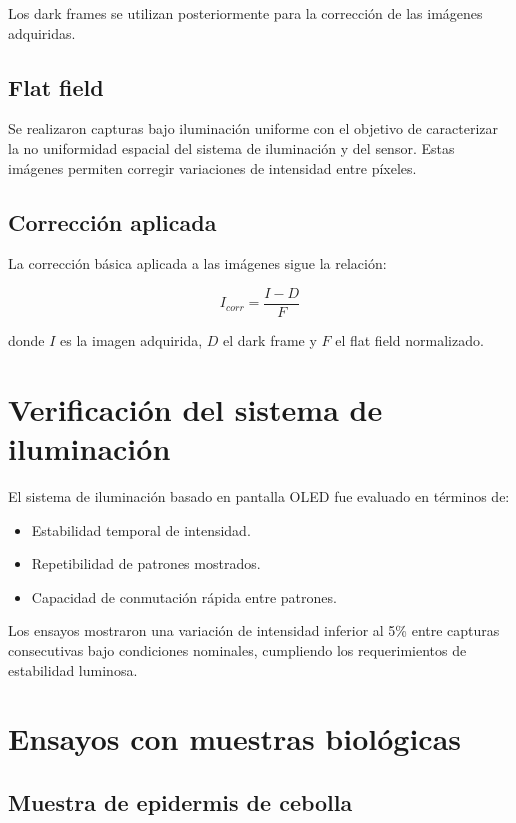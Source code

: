 Los dark frames se utilizan posteriormente para la corrección de las imágenes
adquiridas.

\subsection{Flat field}

Se realizaron capturas bajo iluminación uniforme con el objetivo de caracterizar
la no uniformidad espacial del sistema de iluminación y del sensor. Estas
imágenes permiten corregir variaciones de intensidad entre píxeles.

\subsection{Corrección aplicada}

La corrección básica aplicada a las imágenes sigue la relación:

\[
I_{corr} = \frac{I - D}{F}
\]

donde $I$ es la imagen adquirida, $D$ el dark frame y $F$ el flat field
normalizado.

\section{Verificación del sistema de iluminación}

El sistema de iluminación basado en pantalla OLED fue evaluado en términos de:
\begin{itemize}
    \item Estabilidad temporal de intensidad.
    \item Repetibilidad de patrones mostrados.
    \item Capacidad de conmutación rápida entre patrones.
\end{itemize}

Los ensayos mostraron una variación de intensidad inferior al 5\% entre capturas
consecutivas bajo condiciones nominales, cumpliendo los requerimientos de
estabilidad luminosa.

\section{Ensayos con muestras biológicas}

\subsection{Muestra de epidermis de cebolla}

